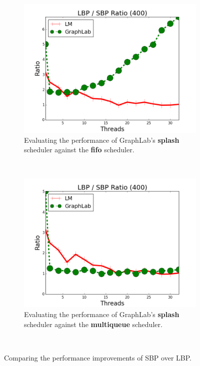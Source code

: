 \begin{figure}[]
        \centering
        \begin{subfigure}[b]{\plotsize\textwidth}
           \includegraphics[width=\textwidth]{experiments/threads/cmp-ratio-fifo-belief-propagation-400.png}
           \caption{Evaluating the performance of GraphLab's \textbf{splash}
           scheduler against the \textbf{fifo} scheduler.}
           \label{fig:threads:splash_ratio_fifo}
        \end{subfigure} ~
        \begin{subfigure}[b]{\plotsize\textwidth}
           \includegraphics[width=\textwidth]{experiments/threads/cmp-ratio-multi-belief-propagation-400.png}
           \caption{Evaluating the performance of GraphLab's \textbf{splash}
           scheduler against the \textbf{multiqueue} scheduler.}
           \label{fig:threads:splash_ratio_multi}
        \end{subfigure} \\
        \caption{Comparing the performance improvements of SBP over LBP.}
        \label{fig:threads:results_splash_ratio}
\end{figure}

